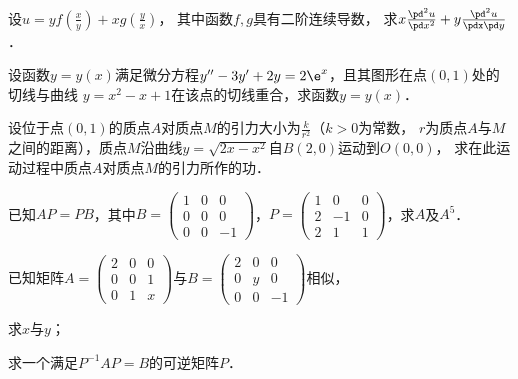 \documentclass[plain,noanswer,medmath]{../../template/jnuexam}
\begin{document}

\begin{problem}
设$u=yf\left(\frac{x}{y} \right)+xg\left(\frac{y}{x} \right)$，
其中函数$f,g$具有二阶连续导数，
求$x\frac{\pd^2 u}{\pd x^2}+y\frac{\pd^2 u}{\pdx\pd y}$．
\end{problem}



\begin{problem}
设函数$y=y(x)$满足微分方程$y''-3y'+2y=2\e^x$，且其图形在点$(0,1)$处的切线与曲线
$y= x^2-x+1$在该点的切线重合，求函数$y=y(x)$．
\end{problem}



\begin{problem}
设位于点$(0,1)$的质点$A$对质点$M$的引力大小为$\frac{k}{r^2}$（$k>0$为常数，
$r$为质点$A$与$M$之间的距离），质点$M$沿曲线$y=\sqrt{2x- x^2}$自$B(2,0)$运动到$O(0,0)$，
求在此运动过程中质点$A$对质点$M$的引力所作的功．
\end{problem}



\begin{problem}
已知$AP=PB$，其中$B=\begin{pmatrix}
  1 & 0 & 0 \\
  0 & 0 & 0 \\
  0 & 0 & -1
\end{pmatrix}$，$P=\begin{pmatrix}
  1 &  0 & 0 \\
  2 & -1 & 0 \\
  2 &  1 & 1
\end{pmatrix}$，求$A$及$A^5$．
\end{problem}



\begin{problem}
已知矩阵$A=\begin{pmatrix}
  2 & 0 & 0 \\
  0 & 0 & 1 \\
  0 & 1 & x
\end{pmatrix}$与$B=\begin{pmatrix}
  2 & 0 & 0 \\
  0 & y & 0 \\
  0 & 0 & -1
\end{pmatrix}$相似，\par
\begin{enumerate*}
\item 求$x$与$y$；
\item 求一个满足$P^{-1} AP=B$的可逆矩阵$P$．
\end{enumerate*}
\end{problem}
\end{document}
